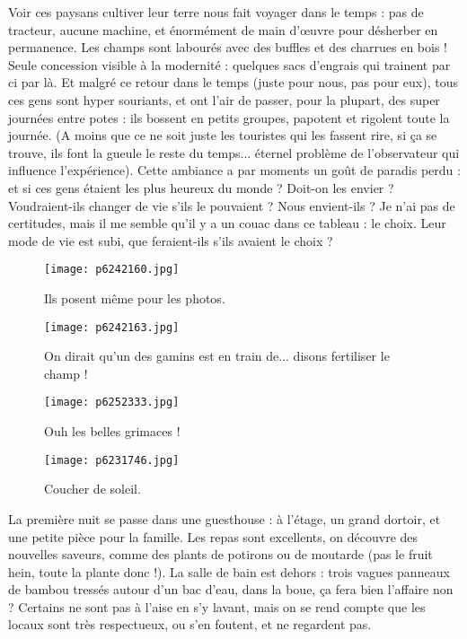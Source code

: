 \documentclass{book}
\begin{document}
Voir ces paysans cultiver leur terre nous fait voyager dans le temps : pas de tracteur, aucune machine, et énormément de main d’œuvre pour désherber en permanence. Les champs sont labourés avec des buffles et des charrues en bois ! Seule concession visible à la modernité : quelques sacs d'engrais qui trainent par ci par là. Et malgré ce retour dans le temps (juste pour nous, pas pour eux), tous ces gens sont hyper souriants, et ont l'air de passer, pour la plupart, des super journées entre potes : ils bossent en petits groupes, papotent et rigolent toute la journée. (A moins que ce ne soit juste les touristes qui les fassent rire, si ça se trouve, ils font la gueule le reste du temps... éternel problème de l'observateur qui influence l'expérience). Cette ambiance a par moments un goût de paradis perdu : et si ces gens étaient les plus heureux du monde ? Doit-on les envier ? Voudraient-ils changer de vie s'ils le pouvaient ? Nous envient-ils ? Je n'ai pas de certitudes, mais il me semble qu'il y a un couac dans ce tableau : le choix. Leur mode de vie est subi, que feraient-ils s'ils avaient le choix ?




\begin{figure}[h]
\centering
\texttt{[image: p6242160.jpg]}
\caption*{Ils posent même pour les photos.}
\end{figure}


\begin{figure}[h]
\centering
\texttt{[image: p6242163.jpg]}
\caption*{On dirait qu'un des gamins est en train de... disons fertiliser le champ !}
\end{figure}


\begin{figure}[h]
\centering
\texttt{[image: p6252333.jpg]}
\caption*{Ouh les belles grimaces !}
\end{figure}


\begin{figure}[h]
\centering
\texttt{[image: p6231746.jpg]}
\caption*{Coucher de soleil.}
\end{figure}

La première nuit se passe dans une guesthouse : à l'étage, un grand dortoir, et une petite pièce pour la famille. Les repas sont excellents, on découvre des nouvelles saveurs, comme des plants de potirons ou de moutarde (pas le fruit hein, toute la plante donc !). La salle de bain est dehors : trois vagues panneaux de bambou tressés autour d'un bac d'eau, dans la boue, ça fera bien l'affaire non ? Certains ne sont pas à l'aise en s'y lavant, mais on se rend compte que les locaux sont très respectueux, ou s'en foutent, et ne regardent pas.
\end{document}
